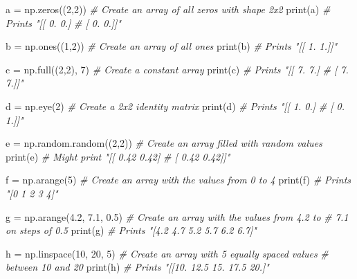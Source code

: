 \documentclass[
]{article}
\newenvironment{Shaded}{}{}
\newcommand{\BuiltInTok}[1]{#1}
\newcommand{\CommentTok}[1]{\textcolor[rgb]{0.38,0.63,0.69}{\textit{#1}}}
\newcommand{\DecValTok}[1]{\textcolor[rgb]{0.25,0.63,0.44}{#1}}
\newcommand{\FloatTok}[1]{\textcolor[rgb]{0.25,0.63,0.44}{#1}}
\newcommand{\NormalTok}[1]{#1}
\newcommand{\OperatorTok}[1]{\textcolor[rgb]{0.40,0.40,0.40}{#1}}
\begin{document}
\begin{Shaded}
\begin{Highlighting}[]
\NormalTok{a }\OperatorTok{=}\NormalTok{ np.zeros((}\DecValTok{2}\NormalTok{,}\DecValTok{2}\NormalTok{))   }\CommentTok{\# Create an array of all zeros with shape 2x2}
\BuiltInTok{print}\NormalTok{(a)              }\CommentTok{\# Prints "[[ 0.  0.]}
                      \CommentTok{\#          [ 0.  0.]]"}

\NormalTok{b }\OperatorTok{=}\NormalTok{ np.ones((}\DecValTok{1}\NormalTok{,}\DecValTok{2}\NormalTok{))    }\CommentTok{\# Create an array of all ones}
\BuiltInTok{print}\NormalTok{(b)              }\CommentTok{\# Prints "[[ 1.  1.]]"}

\NormalTok{c }\OperatorTok{=}\NormalTok{ np.full((}\DecValTok{2}\NormalTok{,}\DecValTok{2}\NormalTok{), }\DecValTok{7}\NormalTok{)  }\CommentTok{\# Create a constant array}
\BuiltInTok{print}\NormalTok{(c)               }\CommentTok{\# Prints "[[ 7.  7.]}
                       \CommentTok{\#          [ 7.  7.]]"}

\NormalTok{d }\OperatorTok{=}\NormalTok{ np.eye(}\DecValTok{2}\NormalTok{)         }\CommentTok{\# Create a 2x2 identity matrix}
\BuiltInTok{print}\NormalTok{(d)              }\CommentTok{\# Prints "[[ 1.  0.]}
                      \CommentTok{\#          [ 0.  1.]]"}

\NormalTok{e }\OperatorTok{=}\NormalTok{ np.random.random((}\DecValTok{2}\NormalTok{,}\DecValTok{2}\NormalTok{))  }\CommentTok{\# Create an array filled with random values}
\BuiltInTok{print}\NormalTok{(e)                     }\CommentTok{\# Might print "[[ 0.42  0.42]}
                             \CommentTok{\#               [ 0.42  0.42]]"}
  
\NormalTok{f }\OperatorTok{=}\NormalTok{ np.arange(}\DecValTok{5}\NormalTok{)             }\CommentTok{\# Create an array with the values from 0 to 4}
\BuiltInTok{print}\NormalTok{(f)                     }\CommentTok{\# Prints "[0 1 2 3 4]"}

\NormalTok{g }\OperatorTok{=}\NormalTok{ np.arange(}\FloatTok{4.2}\NormalTok{, }\FloatTok{7.1}\NormalTok{, }\FloatTok{0.5}\NormalTok{)  }\CommentTok{\# Create an array with the values from 4.2 to }
                              \CommentTok{\# 7.1 on steps of 0.5}
\BuiltInTok{print}\NormalTok{(g)                      }\CommentTok{\# Prints "[4.2 4.7 5.2 5.7 6.2 6.7]"}

\NormalTok{h }\OperatorTok{=}\NormalTok{ np.linspace(}\DecValTok{10}\NormalTok{, }\DecValTok{20}\NormalTok{, }\DecValTok{5}\NormalTok{)  }\CommentTok{\# Create an array with 5 equally spaced values }
                            \CommentTok{\# between 10 and 20}
\BuiltInTok{print}\NormalTok{(h)                    }\CommentTok{\# Prints "[[10. 12.5 15. 17.5 20.]"}
\end{Highlighting}
\end{Shaded}
\end{document}
